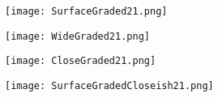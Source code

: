 \begin{figure}[!h]
   \centering
   \texttt{[image: SurfaceGraded21.png]}
\end{figure}

\begin{figure}[!h]
   \centering
   \texttt{[image: WideGraded21.png]}
\end{figure}

\begin{figure}[!h]
   \centering
   \texttt{[image: CloseGraded21.png]}
\end{figure}

\begin{figure}[!h]
   \centering
   \texttt{[image: SurfaceGradedCloseish21.png]}
\end{figure}